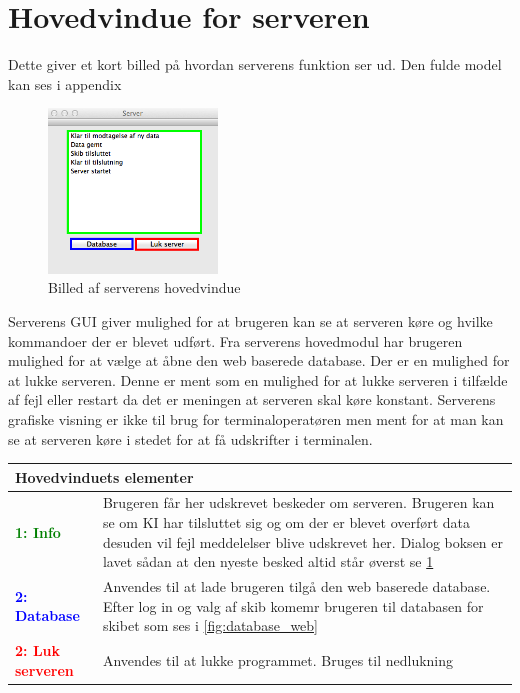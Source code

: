 \section*{Hovedvindue for serveren}
Dette giver et kort billed på hvordan serverens funktion ser ud. Den fulde model kan ses i appendix
\begin{figure}[htbp]
	\centering
	\includegraphics[width=0.4\textwidth]{billeder/server}
	\caption{Billed af serverens hovedvindue}
	\label{fig:server}
\end{figure}
Serverens GUI giver mulighed for at brugeren kan se at serveren køre og hvilke kommandoer der er blevet udført. Fra serverens hovedmodul har brugeren mulighed for at vælge at åbne den web baserede database. Der er en mulighed for at lukke serveren. Denne er ment som en mulighed for at lukke serveren i tilfælde af fejl eller restart da det er meningen at serveren skal køre konstant. Serverens grafiske visning er ikke til brug for terminaloperatøren men ment for at man kan se at serveren køre i stedet for at få udskrifter i terminalen.
\begin{table}[H]
\begin{tabular}{l p{12.5cm}}
\multicolumn{2}{l}{Hovedvinduets elementer} \\
\hline
\textcolor{green}{\textbf{1: Info}}
&Brugeren får her udskrevet beskeder om serveren. Brugeren kan se om KI har tilsluttet sig og om der er blevet overført data desuden vil fejl meddelelser blive udskrevet her. Dialog boksen er lavet sådan at den nyeste besked altid står øverst se \ref{fig:server}\\

\textcolor{blue}{\textbf{2: Database}}
&Anvendes til at lade brugeren tilgå den web baserede database. Efter log in og valg af skib komemr brugeren til databasen for skibet som ses i \ref{fig:database_web}\\

\textcolor{red}{\textbf{2: Luk serveren}}
&Anvendes til at lukke programmet. Bruges til nedlukning\\

\end{tabular}
\end{table}


